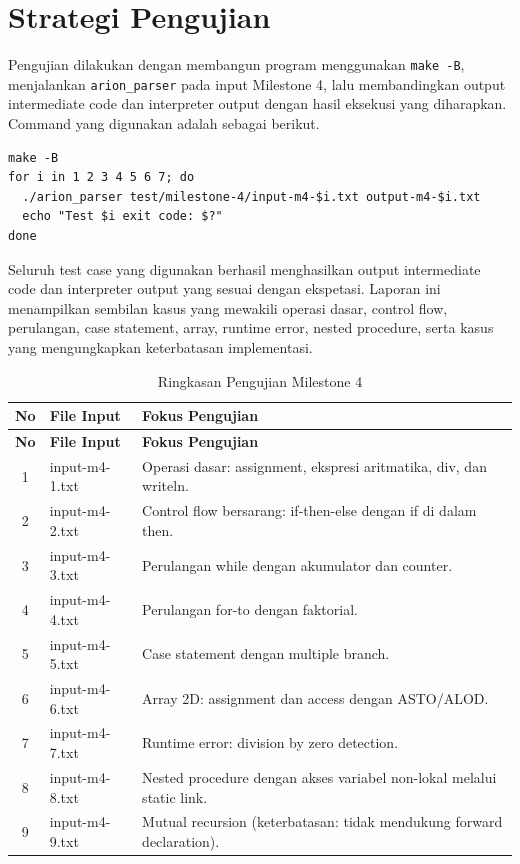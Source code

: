 \section{Strategi Pengujian}
Pengujian dilakukan dengan membangun program menggunakan \texttt{make -B}, menjalankan \texttt{arion\_parser} pada input Milestone 4, lalu membandingkan output intermediate code dan interpreter output dengan hasil eksekusi yang diharapkan. Command yang digunakan adalah sebagai berikut.

\begin{tcolorbox}[title=Command Pengujian,colback=gray!5,colframe=black!60,boxrule=0.5pt,arc=2mm]
  \begin{verbatim}
make -B
for i in 1 2 3 4 5 6 7; do
  ./arion_parser test/milestone-4/input-m4-$i.txt output-m4-$i.txt
  echo "Test $i exit code: $?"
done
\end{verbatim}
\end{tcolorbox}

Seluruh test case yang digunakan berhasil menghasilkan output intermediate code dan interpreter output yang sesuai dengan ekspetasi. Laporan ini menampilkan sembilan kasus yang mewakili operasi dasar, control flow, perulangan, case statement, array, runtime error, nested procedure, serta kasus yang mengungkapkan keterbatasan implementasi.

{\small
\begin{longtable}{|c|>{\raggedright\arraybackslash}p{4.2cm}|>{\raggedright\arraybackslash}p{7.8cm}|}
  \caption{Ringkasan Pengujian Milestone 4} \label{tab:ringkasan-m4} \\
  \hline
  \textbf{No} & \textbf{File Input} & \textbf{Fokus Pengujian} \\
  \hline
  \endfirsthead
  \hline
  \textbf{No} & \textbf{File Input} & \textbf{Fokus Pengujian} \\
  \hline
  \endhead
  1 & input-m4-1.txt & Operasi dasar: assignment, ekspresi aritmatika, div, dan writeln. \\
  \hline
  2 & input-m4-2.txt & Control flow bersarang: if-then-else dengan if di dalam then. \\
  \hline
  3 & input-m4-3.txt & Perulangan while dengan akumulator dan counter. \\
  \hline
  4 & input-m4-4.txt & Perulangan for-to dengan faktorial. \\
  \hline
  5 & input-m4-5.txt & Case statement dengan multiple branch. \\
  \hline
  6 & input-m4-6.txt & Array 2D: assignment dan access dengan ASTO/ALOD. \\
  \hline
  7 & input-m4-7.txt & Runtime error: division by zero detection. \\
  \hline
  8 & input-m4-8.txt & Nested procedure dengan akses variabel non-lokal melalui static link. \\
  \hline
  9 & input-m4-9.txt & Mutual recursion (keterbatasan: tidak mendukung forward declaration). \\
  \hline
\end{longtable}
}

